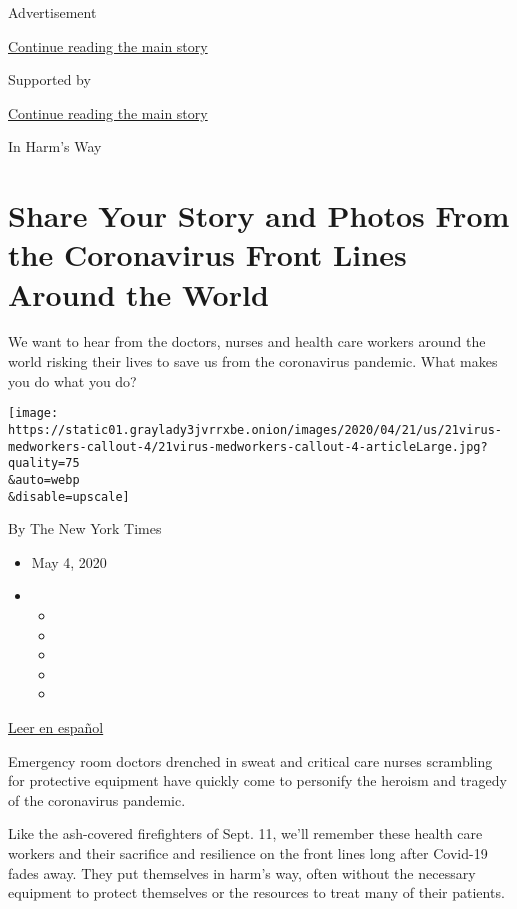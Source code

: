 Advertisement

\protect\hyperlink{after-top}{Continue reading the main story}

Supported by

\protect\hyperlink{after-sponsor}{Continue reading the main story}

In Harm's Way

\hypertarget{share-your-story-and-photos-from-the-coronavirus-front-lines-around-the-world}{%
\section{Share Your Story and Photos From the Coronavirus Front Lines
Around the
World}\label{share-your-story-and-photos-from-the-coronavirus-front-lines-around-the-world}}

We want to hear from the doctors, nurses and health care workers around
the world risking their lives to save us from the coronavirus pandemic.
What makes you do what you do?

\texttt{[image: https://static01.graylady3jvrrxbe.onion/images/2020/04/21/us/21virus-medworkers-callout-4/21virus-medworkers-callout-4-articleLarge.jpg?quality=75\\\&auto=webp\\\&disable=upscale]}

By The New York Times

\begin{itemize}
\item
  May 4, 2020
\item
  \begin{itemize}
  \item
  \item
  \item
  \item
  \item
  \end{itemize}
\end{itemize}

\href{https://www.nytimes3xbfgragh.onion/es/2020/04/21/espanol/mundo/compartenos-tus-fotos-desde-la-trinchera-del-coronavirus.html}{Leer
en español}

Emergency room doctors drenched in sweat and critical care nurses
scrambling for protective equipment have quickly come to personify the
heroism and tragedy of the coronavirus pandemic.

Like the ash-covered firefighters of Sept. 11, we'll remember these
health care workers and their sacrifice and resilience on the front
lines long after Covid-19 fades away. They put themselves in harm's way,
often without the necessary equipment to protect themselves or the
resources to treat many of their patients.

